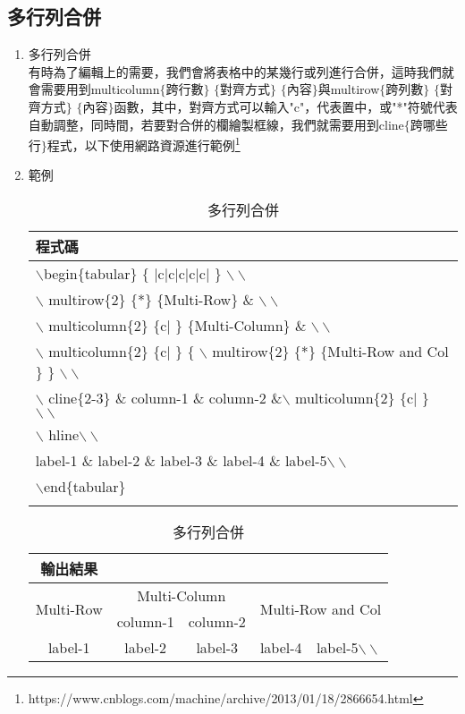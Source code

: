 \subsection{多行列合併}
\begin{enumerate}
\item 多行列合併\\
有時為了編輯上的需要，我們會將表格中的某幾行或列進行合併，這時我們就會需要用到{\A multicolumn}$\{$跨行數$\}$ $\{$對齊方式$\}$ $\{$內容$\}$與{\A multirow}$\{$跨列數$\}$ $\{$對齊方式$\}$ $\{$內容$\}$函數，其中，對齊方式可以輸入"c"，代表置中，或"*"符號代表自動調整，同時間，若要對合併的欄繪製框線，我們就需要用到{\A cline}$\{$跨哪些行$\}$程式，以下使用網路資源進行範例\footnote{https://www.cnblogs.com/machine/archive/2013/01/18/2866654.html}
\item 範例\\
\begin{table}[H]\caption{多行列合併}\label{mulit}
\centering
    \extrarowheight=2pt
    \begin{tabular}{l}
    程式碼\\
    \hline
	$\backslash$begin$\{$tabular$\}$ $\{$ $|$c$|$c$|$c$|$c$|$c$|$ $\}$ $\backslash\backslash$\\
	$\backslash$ multirow$\{$2$\}$ $\{$*$\}$ $\{$Multi-Row$\}$ \& $\backslash\backslash$\\
	$\backslash$ multicolumn$\{$2$\}$ $\{$c$|$ $\}$ $\{$Multi-Column$\}$ \& $\backslash\backslash$\\
	$\backslash$ multicolumn$\{$2$\}$ $\{$c$|$ $\}$ $\{$ $\backslash$ multirow$\{$2$\}$ $\{$*$\}$ $\{$Multi-Row and Col$\}$ $\}$ $\backslash\backslash$\\
	$\backslash$ cline$\{$2-3$\}$ \& column-1 \& column-2 \&$\backslash$ multicolumn$\{$2$\}$ $\{$c$|$ $\}$ $\backslash\backslash$\\
	$\backslash$ hline$\backslash\backslash$\\
	label-1 \& label-2 \& label-3 \& label-4 \& label-5$\backslash\backslash$\\
	$\backslash$end$\{$tabular$\}$\\\\
    \end{tabular}\hspace{20pt} 
	\begin{tabular}{|c|c|c|c|c|}    
	\multicolumn{1}{c}{輸出結果}\\
	\hline
	\multirow{2}{*}{Multi-Row} &
	\multicolumn{2}{c|}{Multi-Column} &
	\multicolumn{2}{c|}{\multirow{2}{*}{Multi-Row and Col}} \\
	\cline{2-3}
  & column-1 & column-2 & \multicolumn{2}{c|}{} \\
	\hline
label-1 & label-2 & label-3 & label-4 & label-5$\backslash\backslash$ \\
	\hline
\end{tabular}
    
\end{table}
\end{enumerate}
